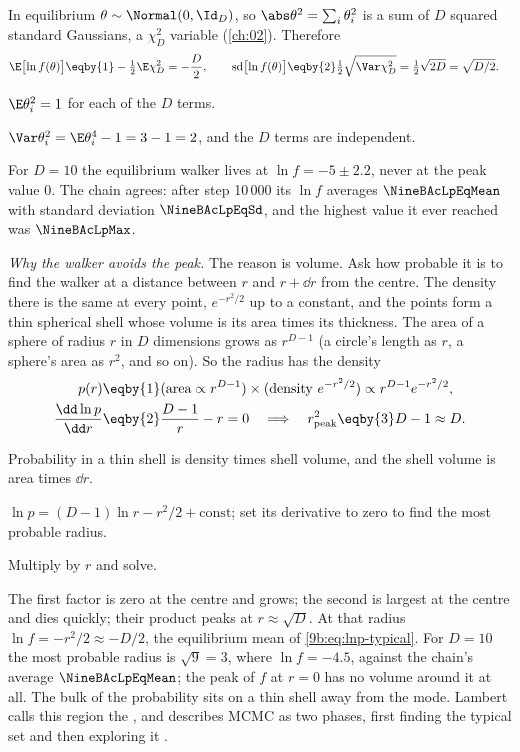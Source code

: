 In equilibrium $\theta\sim\Normal(0,\Id_D)$, so $\abs\theta^2=\sum_i\theta_i^2$ is a sum of $D$
squared standard Gaussians, a $\chi^2_D$ variable (\cref{ch:02}). Therefore
\begin{align}
  \E\bigl[\ln f(\theta)\bigr]
  &\eqby{1}-\tfrac12\E\chi^2_D=-\frac D2,
  \qquad
  \mathrm{sd}\bigl[\ln f(\theta)\bigr]
  \eqby{2}\tfrac12\sqrt{\Var\chi^2_D}=\tfrac12\sqrt{2D}=\sqrt{D/2}.
  \label{9b:eq:lnp-typical}
\end{align}
\begin{explain}
  \item $\E\theta_i^2=1$ for each of the $D$ terms.
  \item $\Var\theta_i^2=\E\theta_i^4-1=3-1=2$, and the $D$ terms are independent.
\end{explain}
For $D=10$ the equilibrium walker lives at $\ln f=-5\pm2.2$, never at the peak value 0. The
chain agrees: after step 10\,000 its $\ln f$ averages $\NineBAcLpEqMean$ with standard deviation
$\NineBAcLpEqSd$, and the highest value it ever reached was $\NineBAcLpMax$.

\emph{Why the walker avoids the peak.} The reason is volume. Ask how probable it is to find the
walker at a distance between $r$ and $r+\dd r$ from the centre. The density there is the same at
every point, $e^{-r^2/2}$ up to a constant, and the points form a thin spherical shell whose volume
is its area times its thickness. The area of a sphere of radius $r$ in $D$ dimensions grows as
$r^{D-1}$ (a circle's length as $r$, a sphere's area as $r^2$, and so on). So the radius has the
density
\begin{align}
  p(r)
  &\eqby{1}(\text{area}\propto r^{D-1})\times(\text{density } e^{-r^2/2})
   \propto r^{D-1}e^{-r^2/2},
  \nonumber\\
  \frac{\dd\ln p}{\dd r}
  &\eqby{2}\frac{D-1}{r}-r=0
   \quad\Longrightarrow\quad
   r_{\rm peak}^2\eqby{3}D-1\approx D .
  \label{9b:eq:shell}
\end{align}
\begin{explain}
  \item Probability in a thin shell is density times shell volume, and the shell volume is
        area times $\dd r$.
  \item $\ln p=(D-1)\ln r-r^2/2+\text{const}$; set its derivative to zero to find the most
        probable radius.
  \item Multiply by $r$ and solve.
\end{explain}
The first factor is zero at the centre and grows; the second is largest at the centre and dies
quickly; their product peaks at $r\approx\sqrt D$. At that radius $\ln f=-r^2/2\approx-D/2$, the
equilibrium mean of \eqref{9b:eq:lnp-typical}. For $D=10$ the most probable radius is
$\sqrt9=3$, where $\ln f=-4.5$, against the chain's average $\NineBAcLpEqMean$; the peak of $f$ at
$r=0$ has no volume around it at all. The bulk of the probability sits on a thin shell away from
the mode. Lambert calls this region the , and describes
MCMC as two phases, first finding the typical set and then exploring it
.

